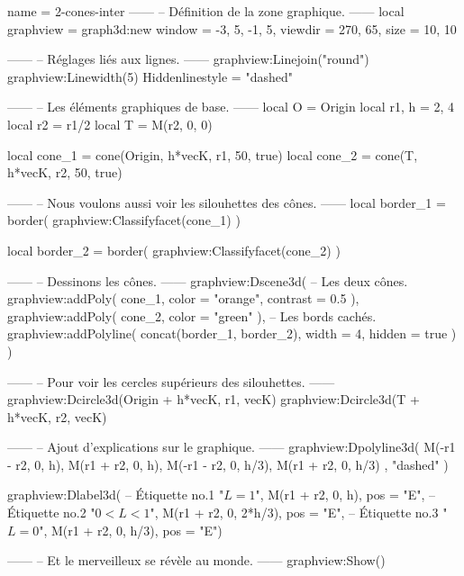 \documentclass[border = 3pt]{standalone}
\begin{document}
\begin{luadraw}{name = 2-cones-inter}
------
-- Définition de la zone graphique.
------
local graphview = graph3d:new{
  window  = {-3, 5, -1, 5},
  viewdir = {270, 65},
  size    = {10, 10}
}

------
-- Réglages liés aux lignes.
------
graphview:Linejoin("round")
graphview:Linewidth(5)
Hiddenlinestyle = "dashed"

------
-- Les éléments graphiques de base.
------
local O     = Origin
local r1, h =  2, 4
local r2    = r1/2
local T     =  M(r2, 0, 0)

local cone_1 = cone(Origin, h*vecK, r1, 50, true)
local cone_2 = cone(T, h*vecK, r2, 50, true)

------
-- Nous voulons aussi voir les silouhettes des cônes.
------
local border_1 = border(
  graphview:Classifyfacet(cone_1)
)

local border_2 = border(
  graphview:Classifyfacet(cone_2)
)

------
-- Dessinons les cônes.
------
graphview:Dscene3d(
-- Les deux cônes.
  graphview:addPoly(
    cone_1,
    {
      color    = "orange",
      contrast = 0.5
    }),
  graphview:addPoly(
    cone_2,
    {
      color = "green"
    }),
-- Les bords cachés.
  graphview:addPolyline(
    concat(border_1, border_2),
    {
      width  = 4,
      hidden = true
    })
)

------
-- Pour voir les cercles supérieurs des silouhettes.
------
graphview:Dcircle3d(Origin + h*vecK, r1, vecK)
graphview:Dcircle3d(T + h*vecK, r2, vecK)

------
-- Ajout d'explications sur le graphique.
------
graphview:Dpolyline3d(
  {
    {M(-r1 - r2,  0,  h), M(r1 + r2,  0,  h)},
    {M(-r1 - r2,  0,  h/3), M(r1 + r2,  0,  h/3)}
  },
  "dashed"
)

graphview:Dlabel3d(
-- Étiquette no.1
  "$L = 1$",
  M(r1 + r2, 0, h),
  {pos = "E"},
-- Étiquette no.2
  "$0 < L <1$",
  M(r1 + r2, 0, 2*h/3),
  {pos = "E"},
-- Étiquette no.3
  "$L = 0$",
  M(r1 + r2, 0, h/3),
  {pos = "E"})

------
-- Et le merveilleux se révèle au monde.
------
graphview:Show()
\end{luadraw}
\end{document}

